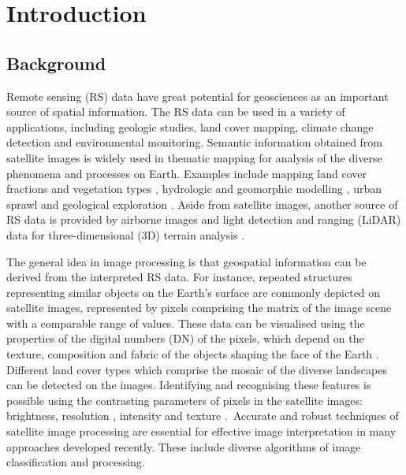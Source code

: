 \documentclass[jimaging,article,accept,pdftex,moreauthors]{Definitions/mdpi}
\begin{document}
\section{Introduction}

\subsection{Background}

Remote sensing (RS) data have great potential {for geosciences as an} important source of spatial information. {The RS data can be used in a variety of applications, including} geologic {studies, land cover mapping,} climate {change detection} and {environmental monitoring}. Semantic information obtained from {satellite images is widely} used in thematic mapping for analysis of {the} diverse phenomena and processes on Earth{. Examples include mapping} land cover fractions \cite{COULIBALY2021108092} and vegetation types \cite{7729337,Lemenkova2020d,6946534,Lemenkova202019,6352694}, hydrologic and geomorphic modelling \cite{TAGNON2020231},{ }urban sprawl {and} geological exploration{ }\cite{1457509,NGOM2022102873}. Aside from satellite images, another source of {RS data }is provided by airborne {images} \cite{JESSELL2015440,SIAGNE2022104680} and light detection and ranging (LiDAR) data for three-dimensional (3D) terrain analysis \cite{SHARMA2021317,8978301,9213897,YEH2017236,9553919,LI201955,GUPTA2022100817}. 

The general idea {in image} processing is that{ geospatial information} can be {derived from the interpreted RS data}. {For instance, }repeated structures representing similar objects on the Earth's surface are commonly depicted on satellite images, represented by pixels comprising {the} matrix of the image scene with a comparable range of values. These data can be{ }visualised using the properties of the digital numbers (DN) of the pixels, which depend on the texture, composition and fabric of the objects shaping the face of the Earth \cite{YUAN2022106966}.{ Different} land cover types which comprise the mosaic of the diverse landscapes can be detected {on the images}. Identifying and recognising these features is possible using the {contrasting }parameters of pixels in the satellite images: brightness, resolution \cite{4426419,322052,5446016}, intensity \cite{4761020,8519176} and texture \cite{995559,899813,8868688}.~{Accurate and robust }techniques{ }of satellite image processing {are} essential {for effective image interpretation in many} approaches{ }developed {recently}. These include{ }diverse algorithms of image classification and processing{.} 
\end{document}
